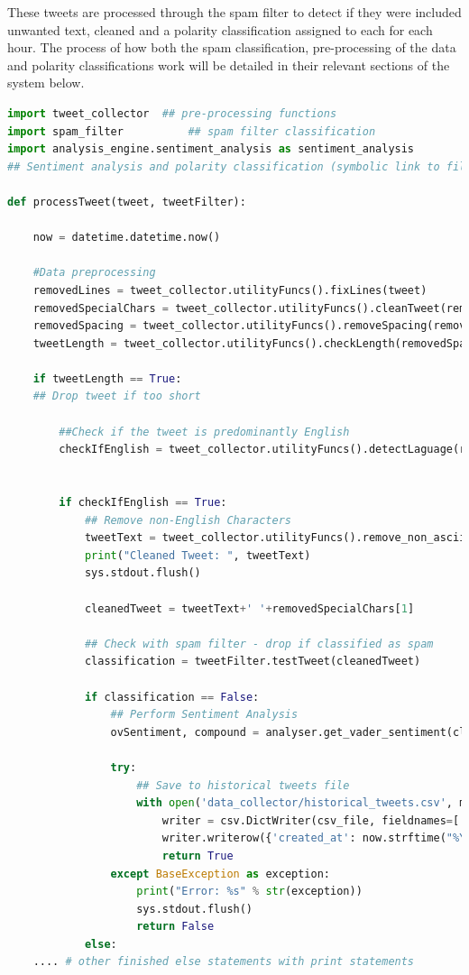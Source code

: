 \documentclass[oneside, 12pt]{article}
\begin{document}
			These tweets are processed through the spam filter to detect if they were included unwanted text, cleaned and a polarity classification assigned to each for each hour. The process of how both the spam classification, pre-processing of the data and polarity classifications work will be detailed in their relevant sections of the system below.
			
			\begin{lstlisting}[language=Python, caption=Sift-text python script - used alongside Curl command in Listing 4]
import tweet_collector	## pre-processing functions
import spam_filter			## spam filter classification
import analysis_engine.sentiment_analysis as sentiment_analysis	
## Sentiment analysis and polarity classification (symbolic link to file)
			
def processTweet(tweet, tweetFilter):
			
	now = datetime.datetime.now()
				
	#Data preprocessing
	removedLines = tweet_collector.utilityFuncs().fixLines(tweet)
	removedSpecialChars = tweet_collector.utilityFuncs().cleanTweet(removedLines)
	removedSpacing = tweet_collector.utilityFuncs().removeSpacing(removedSpecialChars[0])
	tweetLength = tweet_collector.utilityFuncs().checkLength(removedSpacing)
			
	if tweetLength == True:
	## Drop tweet if too short
				
		##Check if the tweet is predominantly English				
		checkIfEnglish = tweet_collector.utilityFuncs().detectLaguage(removedSpecialChars[0])
			
			
		if checkIfEnglish == True:
			## Remove non-English Characters
			tweetText = tweet_collector.utilityFuncs().remove_non_ascii(removedSpacing)
			print("Cleaned Tweet: ", tweetText)
			sys.stdout.flush()
			
			cleanedTweet = tweetText+' '+removedSpecialChars[1]
			
			## Check with spam filter - drop if classified as spam
			classification = tweetFilter.testTweet(cleanedTweet)
			
			if classification == False:
				## Perform Sentiment Analysis
				ovSentiment, compound = analyser.get_vader_sentiment(cleanedTweet)
							
				try:
					## Save to historical tweets file
					with open('data_collector/historical_tweets.csv', mode='a') as csv_file:
						writer = csv.DictWriter(csv_file, fieldnames=['created_at', 'tweet', 'sentiment', 'compound'])
						writer.writerow({'created_at': now.strftime("%Y-%m-%d %H:%M"), 'tweet': cleanedTweet, 'sentiment': ovSentiment, 'compound': compound})
						return True
				except BaseException as exception:
					print("Error: %s" % str(exception))
					sys.stdout.flush()
					return False
			else:
	.... # other finished else statements with print statements
			\end{lstlisting}
			
\end{document}
